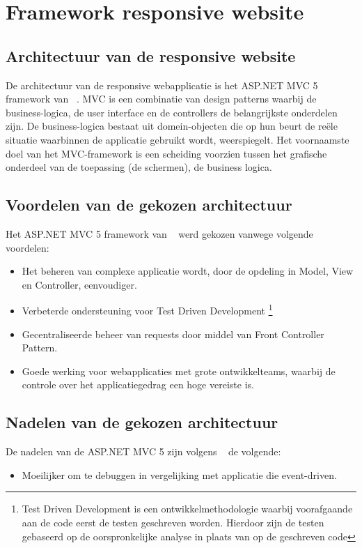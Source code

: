 \chapter{Framework responsive website}
\label{ch:frameworkresponsivewebsite}
\section{Architectuur van de responsive website}
De architectuur van de responsive webapplicatie is het ASP.NET MVC 5 framework van ~\cite{aspnetmvcoverview}.
MVC is een combinatie van design patterns waarbij de business-logica, de user interface en de controllers de belangrijkste
onderdelen zijn. De business-logica bestaat uit domein-objecten die op hun beurt de reële situatie waarbinnen de applicatie
gebruikt wordt, weerspiegelt. Het voornaamste doel van het MVC-framework is een scheiding voorzien tussen het grafische
onderdeel van de toepassing (de schermen), de business logica.
\section{Voordelen van de gekozen architectuur}
Het ASP.NET MVC 5 framework van ~\cite{aspnetmvcoverview} werd gekozen vanwege volgende voordelen:
\begin{itemize}
  \item Het beheren van complexe applicatie wordt, door de opdeling in Model, View en Controller, eenvoudiger.
  \item Verbeterde ondersteuning voor Test Driven Development \footnote{Test Driven Development is een ontwikkelmethodologie waarbij voorafgaande aan de code eerst de testen geschreven worden. Hierdoor zijn de testen gebaseerd op de oorspronkelijke analyse in plaats van op de geschreven code}
  \item Gecentraliseerde beheer van requests door middel van Front Controller Pattern.
  \item Goede werking voor webapplicaties met grote ontwikkelteams, waarbij de controle over het applicatiegedrag een hoge vereiste is.
\end{itemize}

\section{Nadelen van de gekozen architectuur}
De nadelen van de ASP.NET MVC 5 zijn volgens ~\cite{hasaspnetcorekilledwebforms} de volgende:
\begin{itemize}
  \item Moeilijker om te debuggen in vergelijking met applicatie die event-driven.
\end{itemize}



